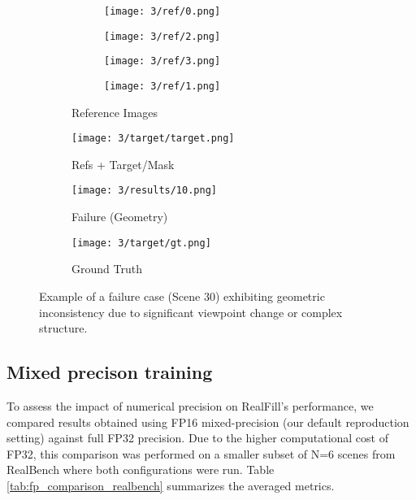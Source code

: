 \documentclass{article}
\begin{document}
\begin{figure}[H]
    \centering
    \begin{subfigure}[b]{0.24\linewidth}
        \begin{subfigure}[b]{0.32\linewidth}
            \texttt{[image: 3/ref/0.png]}
        \end{subfigure}
        \begin{subfigure}[b]{0.32\linewidth}
            \texttt{[image: 3/ref/2.png]}
        \end{subfigure}
        \begin{subfigure}[b]{0.32\linewidth}
            \texttt{[image: 3/ref/3.png]}
        \end{subfigure}
        \begin{subfigure}[b]{1\linewidth}
            \texttt{[image: 3/ref/1.png]}
        \end{subfigure}
        \caption{Reference Images}
    \end{subfigure}
    \hfill
    \begin{subfigure}[b]{0.24\linewidth}
        \centering
        \texttt{[image: 3/target/target.png]}
        \caption{Refs + Target/Mask}
    \end{subfigure}
    \hfill
    \begin{subfigure}[b]{0.24\linewidth}
        \centering
        \texttt{[image: 3/results/10.png]} %
        \caption{Failure (Geometry)}
    \end{subfigure}
    \hfill
    \begin{subfigure}[b]{0.24\linewidth}
        \centering
        \texttt{[image: 3/target/gt.png]} %
        \caption{Ground Truth}
    \end{subfigure}
    \caption{Example of a failure case (Scene 30) exhibiting geometric inconsistency due to significant viewpoint change or complex structure.}
    \label{fig:failure_geometric}
\end{figure}

\subsection{Mixed precison training}
\label{subsec:mixed_precision_training}
To assess the impact of numerical precision on RealFill's performance, we compared results obtained using FP16 mixed-precision (our default reproduction setting) against full FP32 precision. Due to the higher computational cost of FP32, this comparison was performed on a smaller subset of N=6 scenes from RealBench where both configurations were run. Table \ref{tab:fp_comparison_realbench} summarizes the averaged metrics.
\end{document}
